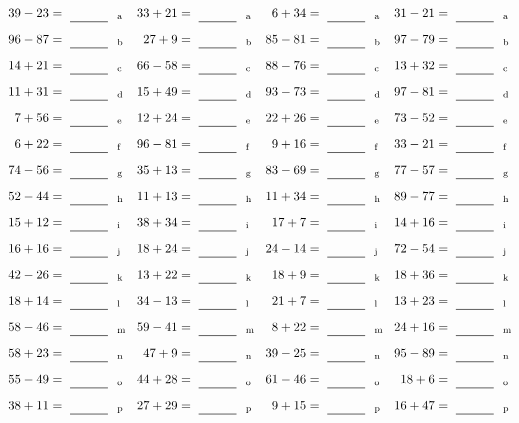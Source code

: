 \documentclass
[
  draft    = true,
  fontsize = 11pt,
  parskip  = half-
]
{scrartcl}
\begin{document}
\clearpage
\begin{align*}
    \pline{39-23}&=\rline{a}
  & \pline{33+21}&=\rline{a}
  & \pline{6+34}&=\rline{a}
  & \pline{31-21}&=\rline{a} \\[1ex]
    \pline{96-87}&=\rline{b}
  & \pline{27+9}&=\rline{b}
  & \pline{85-81}&=\rline{b}
  & \pline{97-79}&=\rline{b} \\[1ex]
    \pline{14+21}&=\rline{c}
  & \pline{66-58}&=\rline{c}
  & \pline{88-76}&=\rline{c}
  & \pline{13+32}&=\rline{c} \\[1ex]
    \pline{11+31}&=\rline{d}
  & \pline{15+49}&=\rline{d}
  & \pline{93-73}&=\rline{d}
  & \pline{97-81}&=\rline{d} \\[1ex]
    \pline{7+56}&=\rline{e}
  & \pline{12+24}&=\rline{e}
  & \pline{22+26}&=\rline{e}
  & \pline{73-52}&=\rline{e} \\[1ex]
    \pline{6+22}&=\rline{f}
  & \pline{96-81}&=\rline{f}
  & \pline{9+16}&=\rline{f}
  & \pline{33-21}&=\rline{f} \\[1ex]
    \pline{74-56}&=\rline{g}
  & \pline{35+13}&=\rline{g}
  & \pline{83-69}&=\rline{g}
  & \pline{77-57}&=\rline{g} \\[1ex]
    \pline{52-44}&=\rline{h}
  & \pline{11+13}&=\rline{h}
  & \pline{11+34}&=\rline{h}
  & \pline{89-77}&=\rline{h} \\[1ex]
    \pline{15+12}&=\rline{i}
  & \pline{38+34}&=\rline{i}
  & \pline{17+7}&=\rline{i}
  & \pline{14+16}&=\rline{i} \\[1ex]
    \pline{16+16}&=\rline{j}
  & \pline{18+24}&=\rline{j}
  & \pline{24-14}&=\rline{j}
  & \pline{72-54}&=\rline{j} \\[1ex]
    \pline{42-26}&=\rline{k}
  & \pline{13+22}&=\rline{k}
  & \pline{18+9}&=\rline{k}
  & \pline{18+36}&=\rline{k} \\[1ex]
    \pline{18+14}&=\rline{l}
  & \pline{34-13}&=\rline{l}
  & \pline{21+7}&=\rline{l}
  & \pline{13+23}&=\rline{l} \\[1ex]
    \pline{58-46}&=\rline{m}
  & \pline{59-41}&=\rline{m}
  & \pline{8+22}&=\rline{m}
  & \pline{24+16}&=\rline{m} \\[1ex]
    \pline{58+23}&=\rline{n}
  & \pline{47+9}&=\rline{n}
  & \pline{39-25}&=\rline{n}
  & \pline{95-89}&=\rline{n} \\[1ex]
    \pline{55-49}&=\rline{o}
  & \pline{44+28}&=\rline{o}
  & \pline{61-46}&=\rline{o}
  & \pline{18+6}&=\rline{o} \\[1ex]
    \pline{38+11}&=\rline{p}
  & \pline{27+29}&=\rline{p}
  & \pline{9+15}&=\rline{p}
  & \pline{16+47}&=\rline{p}
\end{align*}
\end{document}
